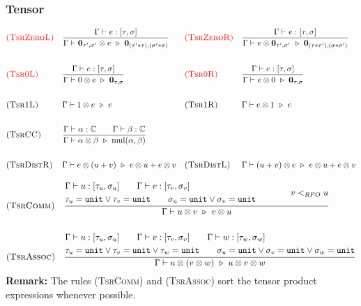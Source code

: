 \subsubsection*{Tensor}
\begin{align*}
  & \textcolor{red}{\textsc{(TsrZeroL)}} && 
  \frac{\Gamma \vdash e : [\tau, \sigma]}{\Gamma \vdash \textbf{0}_{\tau', \sigma'} \otimes e \ \triangleright\  \textbf{0}_{(\tau' * \tau), (\sigma' * \sigma)}} 
  && \textcolor{red}{\textsc{(TsrZeroR)}} && 
  \frac{\Gamma \vdash e : [\tau, \sigma]}{\Gamma \vdash e \otimes \textbf{0}_{\tau', \sigma'} \ \triangleright\  \textbf{0}_{(\tau * \tau'), (\sigma * \sigma')}} \\
  \\
  & \textcolor{red}{\textsc{(Tsr0L)}} && \frac{\Gamma \vdash e : [\tau, \sigma]}{\Gamma \vdash 0 \otimes e \ \triangleright\  \mathbf{0}_{\tau,\sigma}}
  && \textcolor{red}{\textsc{(Tsr0R)}} && \frac{\Gamma \vdash e : [\tau, \sigma]}{\Gamma \vdash e \otimes 0 \ \triangleright\  \mathbf{0}_{\tau,\sigma}} \\
  \\
  & \textsc{(Tsr1L)} &&
  \Gamma \vdash 1 \otimes e \ \triangleright\  e
  && \textsc{(Tsr1R)} &&
  \Gamma \vdash e \otimes 1 \ \triangleright\  e \\
  \\
  & \textsc{(TsrCC)} && \frac{\Gamma \vdash \alpha: \mathbb{C} \qquad \Gamma \vdash \beta : \mathbb{C}}{\Gamma \vdash \alpha \otimes \beta \ \triangleright\  \mathrm{mul}(\alpha, \beta)} \\
  \\
  & \textsc{(TsrDistR)} && \Gamma \vdash e \otimes (u + v) \ \triangleright\  e \otimes u + e \otimes v
  && \textsc{(TsrDistL)} &&
  \Gamma \vdash (u + v) \otimes e \ \triangleright\  e \otimes u + e \otimes v
\end{align*}
  
\begin{align*}
  & \textsc{(TsrComm)} && 
  \frac{
    \begin{aligned}
      & \Gamma \vdash u : [\tau_u, \sigma_u] \qquad \Gamma \vdash v : [\tau_v, \sigma_v] \\
      & \tau_u = \texttt{unit} \vee \tau_v = \texttt{unit} \qquad \sigma_u = \texttt{unit} \vee \sigma_v = \texttt{unit}
    \end{aligned} \qquad \qquad v <_{RPO} u
    }{\Gamma \vdash u \otimes v \ \triangleright\  v \otimes u} \\
  \\
  & \textsc{(TsrAssoc)} &&
  \frac{
    \begin{aligned}
      & \Gamma \vdash u : [\tau_u, \sigma_u] \qquad \Gamma \vdash v : [\tau_v, \sigma_v] \qquad \Gamma \vdash w : [\tau_w, \sigma_w] \\
      & \tau_u = \texttt{unit} \vee \tau_v = \texttt{unit} \vee \tau_w = \texttt{unit} \qquad \sigma_u = \texttt{unit} \vee \sigma_v = \texttt{unit} \vee \sigma_w = \texttt{unit}
    \end{aligned}
    }{\Gamma \vdash u \otimes (v \otimes w) \ \triangleright\  u \otimes v \otimes w}
\end{align*}
\textbf{Remark:} The rules \textsc{(TsrComm)} and \textsc{(TsrAssoc)} sort the tensor product expressions whenever possible.

